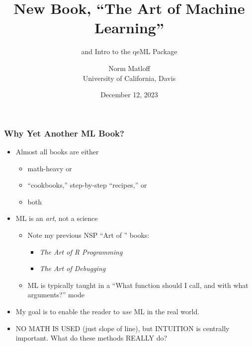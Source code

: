 \documentclass{beamer}
\title{New Book, ``The Art of Machine Learning''}
\subtitle{and Intro to the qeML Package}
\author{Norm Matloff \\
University of California, Davis \\
}
\date{
December 12, 2023 
}
\begin{document}
 


\begin{frame}
\titlepage


\end{frame}

\begin{frame} 
\frametitle{Why Yet Another ML Book?}\pause

\begin{itemize}

\item Almost all books are either 

   \begin{itemize}

   \item math-heavy or

   \item ``cookbooks,'' step-by-step ``recipes,'' or

   \item both

   \end{itemize} 
   \pause

\item ML is an \textit{art}, not a science

   \begin{itemize}

   \item Note my previous NSP ``Art of '' books:

   \begin{itemize}

      \item \textit{The Art of R Programming}
   
      \item \textit{The Art of Debugging}

   \end{itemize} 

   \item ML is typically taught in a ``What function should I call,
   and with what arguments?'' mode

   \end{itemize} 

\pause
\item My goal is to enable the reader to \textit{use} ML in the real
world.
\pause

\item NO MATH IS USED (just slope of line), but INTUITION is centrally
important.
\pause
What do these methods REALLY do?

\end{itemize} 

\end{frame} 
\end{document}
